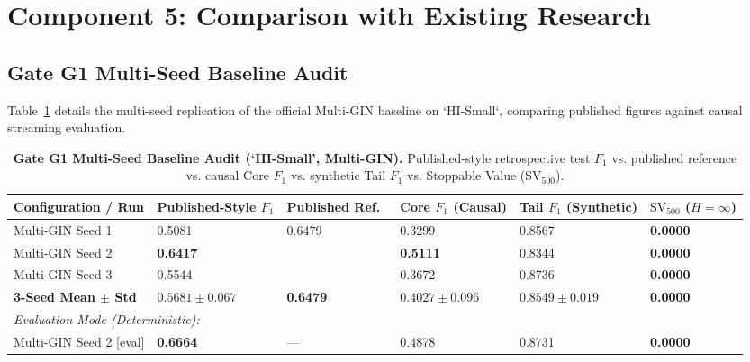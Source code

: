 \documentclass[11pt,a4paper]{article}
\begin{document}
\section{Component 5: Comparison with Existing Research}
\label{sec:comp5_comparison}

\subsection{Gate G1 Multi-Seed Baseline Audit}
Table~\ref{tab:gate_g1_comp} details the multi-seed replication of the official Multi-GIN baseline on `HI-Small`, comparing published figures against causal streaming evaluation.

\begin{table}[ht]
\centering
\small
\caption{\textbf{Gate G1 Multi-Seed Baseline Audit (`HI-Small', Multi-GIN).} Published-style retrospective test $F_1$ vs. published reference vs. causal Core $F_1$ vs. synthetic Tail $F_1$ vs. Stoppable Value ($\text{SV}_{500}$).}
\label{tab:gate_g1_comp}
\begin{tabularx}{\textwidth}{lXXXXX}
\toprule
\textbf{Configuration / Run} & \textbf{Published-Style $F_1$} & \textbf{Published Ref.~\cite{egressy2024multigraph}} & \textbf{Core $F_1$ (Causal)} & \textbf{Tail $F_1$ (Synthetic)} & \textbf{$\text{SV}_{500}$ ($H=\infty$)} \\
\midrule
Multi-GIN Seed 1 & 0.5081 & \multirow{3}{*}{0.6479} & 0.3299 & 0.8567 & \textbf{0.0000} \\
Multi-GIN Seed 2 & \textbf{0.6417} &  & \textbf{0.5111} & 0.8344 & \textbf{0.0000} \\
Multi-GIN Seed 3 & 0.5544 &  & 0.3672 & 0.8736 & \textbf{0.0000} \\
\midrule
\textbf{3-Seed Mean $\pm$ Std} & \textbf{$0.5681 \pm 0.067$} & \textbf{0.6479} & \textbf{$0.4027 \pm 0.096$} & \textbf{$0.8549 \pm 0.019$} & \textbf{0.0000} \\
\midrule
\multicolumn{6}{l}{\emph{Evaluation Mode (Deterministic):}} \\
Multi-GIN Seed 2 [eval] & \textbf{0.6664} & — & 0.4878 & 0.8731 & \textbf{0.0000} \\
\bottomrule
\end{tabularx}
\end{table}
\end{document}
